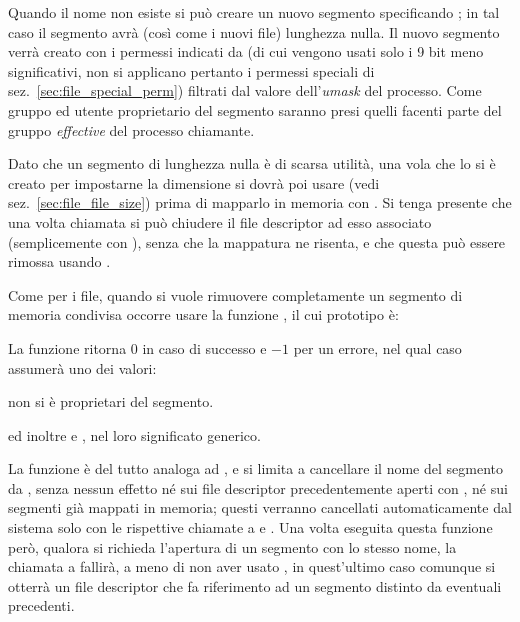Quando il nome non esiste si può creare un nuovo segmento specificando
; in tal caso il segmento avrà (così come i nuovi file)
lunghezza nulla. Il nuovo segmento verrà creato con i permessi indicati
da  (di cui vengono usati solo i 9 bit meno significativi, non si
applicano pertanto i permessi speciali di sez.~\ref{sec:file_special_perm})
filtrati dal valore dell'\textit{umask} del processo. Come gruppo ed utente
proprietario del segmento saranno presi quelli facenti parte del gruppo
\textit{effective} del processo chiamante.

Dato che un segmento di lunghezza nulla è di scarsa utilità, una vola che lo
si è creato per impostarne la dimensione si dovrà poi usare 
(vedi sez.~\ref{sec:file_file_size}) prima di mapparlo in memoria con
.  Si tenga presente che una volta chiamata  si può
chiudere il file descriptor ad esso associato (semplicemente con
), senza che la mappatura ne risenta, e che questa può essere
rimossa usando .

Come per i file, quando si vuole rimuovere completamente un segmento di
memoria condivisa occorre usare la funzione , il cui
prototipo è:

\begin{funcproto}{

}

{La funzione ritorna $0$ in caso di successo e $-1$ per un errore, nel qual
  caso  assumerà uno dei valori:
  \begin{errlist}
  \item[\errcode{EACCES}] non si è proprietari del segmento.
  \end{errlist}
  ed inoltre  e , nel loro significato
  generico.
}  
\end{funcproto}

La funzione è del tutto analoga ad , e si limita a cancellare il
nome del segmento da , senza nessun effetto né sui file
descriptor precedentemente aperti con , né sui segmenti già
mappati in memoria; questi verranno cancellati automaticamente dal sistema
solo con le rispettive chiamate a  e .  Una volta
eseguita questa funzione però, qualora si richieda l'apertura di un segmento
con lo stesso nome, la chiamata a  fallirà, a meno di non aver
usato , in quest'ultimo caso comunque si otterrà un file
descriptor che fa riferimento ad un segmento distinto da eventuali precedenti.

